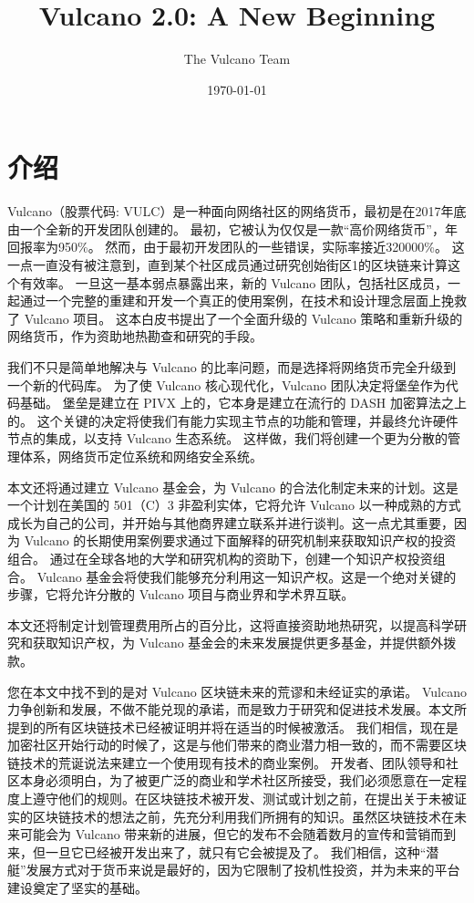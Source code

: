 \documentclass[A4paper, 12pt]{article}
\begin{document}
\title{Vulcano 2.0: A New Beginning}
\author{The Vulcano Team}
\date{\today}

\newpage
\tableofcontents
\newpage
\section{介绍}

Vulcano（股票代码:   VULC）是一种面向网络社区的网络货币，最初是在2017年底由一个全新的开发团队创建的。   最初，它被认为仅仅是一款“高价网络货币”，年回报率为950\%。  然而，由于最初开发团队的一些错误，实际率接近320000\%。   这一点一直没有被注意到，直到某个社区成员通过研究创始街区1的区块链来计算这个有效率。  一旦这一基本弱点暴露出来，新的 Vulcano 团队，包括社区成员，一起通过一个完整的重建和开发一个真正的使用案例，在技术和设计理念层面上挽救了 Vulcano 项目。   这本白皮书提出了一个全面升级的 Vulcano 策略和重新升级的网络货币，作为资助地热勘查和研究的手段。 

我们不只是简单地解决与 Vulcano 的比率问题，而是选择将网络货币完全升级到一个新的代码库。   为了使 Vulcano 核心现代化，Vulcano 团队决定将堡垒作为代码基础。   堡垒是建立在 PIVX 上的，它本身是建立在流行的 DASH 加密算法之上的。  这个关键的决定将使我们有能力实现主节点的功能和管理，并最终允许硬件节点的集成，以支持 Vulcano 生态系统。  这样做，我们将创建一个更为分散的管理体系，网络货币定位系统和网络安全系统。

本文还将通过建立 Vulcano 基金会，为 Vulcano 的合法化制定未来的计划。这是一个计划在美国的 501（C）3 非盈利实体，它将允许 Vulcano 以一种成熟的方式成长为自己的公司，并开始与其他商界建立联系并进行谈判。这一点尤其重要，因为 Vulcano 的长期使用案例要求通过下面解释的研究机制来获取知识产权的投资组合。  通过在全球各地的大学和研究机构的资助下，创建一个知识产权投资组合。   Vulcano 基金会将使我们能够充分利用这一知识产权。这是一个绝对关键的步骤，它将允许分散的 Vulcano 项目与商业界和学术界互联。 

本文还将制定计划管理费用所占的百分比，这将直接资助地热研究，以提高科学研究和获取知识产权，为 Vulcano 基金会的未来发展提供更多基金，并提供额外拨款。 

您在本文中找不到的是对 Vulcano 区块链未来的荒谬和未经证实的承诺。  Vulcano 力争创新和发展，不做不能兑现的承诺，而是致力于研究和促进技术发展。本文所提到的所有区块链技术已经被证明并将在适当的时候被激活。   我们相信，现在是加密社区开始行动的时候了，这是与他们带来的商业潜力相一致的，而不需要区块链技术的荒诞说法来建立一个使用现有技术的商业案例。  开发者、团队领导和社区本身必须明白，为了被更广泛的商业和学术社区所接受，我们必须愿意在一定程度上遵守他们的规则。在区块链技术被开发、测试或计划之前，在提出关于未被证实的区块链技术的想法之前，先充分利用我们所拥有的知识。虽然区块链技术在未来可能会为 Vulcano 带来新的进展，但它的发布不会随着数月的宣传和营销而到来，但一旦它已经被开发出来了，就只有它会被提及了。  我们相信，这种“潜艇”发展方式对于货币来说是最好的，因为它限制了投机性投资，并为未来的平台建设奠定了坚实的基础。 
\end{document}
